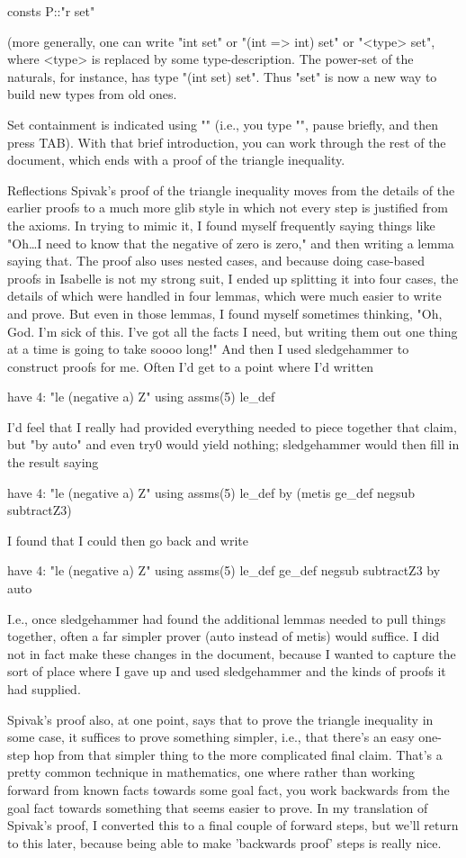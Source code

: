 consts
P::"r set"

(more generally, one can write "int set" or "(int => int) set" or "<type> set", where <type> is replaced by some type-description. The power-set of the naturals, for instance, has type "(int set) set". Thus "set" is now a new way to build new types from old ones. 

Set containment is indicated using "\in" (i.e., you type "\in", pause briefly, and then press TAB). 
With that brief introduction, you can work through the rest of the document, which ends with a proof of the triangle inequality. 

Reflections
Spivak's proof of the triangle inequality moves from the details of the earlier proofs to a much more glib style in which not every step is justified from the axioms. In trying to mimic it, I found myself frequently saying things like "Oh…I need to know that the negative of zero is zero," and then writing a lemma saying that. The proof also uses nested cases, and because doing case-based proofs in Isabelle is not my strong suit, I ended up splitting it into four cases, the details of which were handled in four lemmas, which were much easier to write and prove. But even in those lemmas, I found myself sometimes thinking, "Oh, God. I'm sick of this. I've got all the facts I need, but writing them out one thing at a time is going to take soooo long!" And then I used sledgehammer to construct proofs for me. Often I'd get to a point where I'd written

   have 4: "le (negative a) Z" using assms(5) le_def 

I'd feel that I really had provided everything needed to piece together that claim, but "by auto" and even try0 would yield nothing; sledgehammer would then fill in the result saying

   have 4: "le (negative a) Z" using assms(5) le_def 
   by (metis ge_def negsub subtractZ3)

I found that I could then go back and write

   have 4: "le (negative a) Z" using assms(5) le_def ge_def   negsub subtractZ3 by auto 

I.e., once sledgehammer had found the additional lemmas needed to pull things together, often a far simpler prover (auto instead of metis) would suffice. I did not in fact make these changes in the document, because I wanted to capture the sort of place where I gave up and used sledgehammer and the kinds of proofs it had supplied. 

Spivak's proof also, at one point, says that to prove the triangle inequality in some case, it suffices to prove something simpler, i.e., that there's an easy one-step hop from that simpler thing to the more complicated final claim. That's a pretty common technique in mathematics, one where rather than working forward from known facts towards some goal fact, you work backwards from the goal fact towards something that seems easier to prove. In my translation of Spivak's proof, I converted this to a final couple of forward steps, but we'll return to this later, because being able to make 'backwards proof' steps is really nice. 

